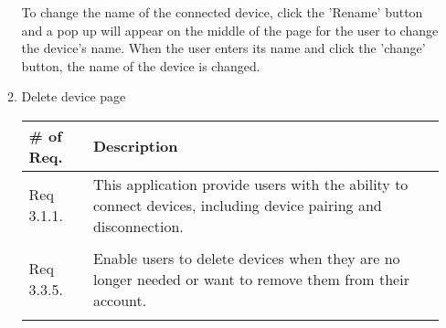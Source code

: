 \begin{enumerate}[label=\arabic*.]
\begin{enumerate}[label*={\arabic*.},ref=\theenumi.\arabic*]
                    To change the name of the connected device, click the 'Rename' button and a pop up will appear on the middle of the page for the user to change the device's name. When the user enters its name and click the 'change' button, the name of the device is changed. \\
                    \newpage
              \item Delete device page
                    \begin{table}[H]
                        \center
                        \begin{tabular}{m{1.4cm} m{5.5cm}}
                            \toprule
                            \# of Req. & Description                                                                                                     \\
                            \midrule
                            Req 3.1.1. & This application provide users with the ability to connect devices, including device pairing and disconnection. \\\\
                            Req 3.3.5. & Enable users to delete devices when they are no longer needed or want to remove them from their account.        \\\\
                            \bottomrule
                        \end{tabular}
                    \end{table}


\end{enumerate}
\end{enumerate}
